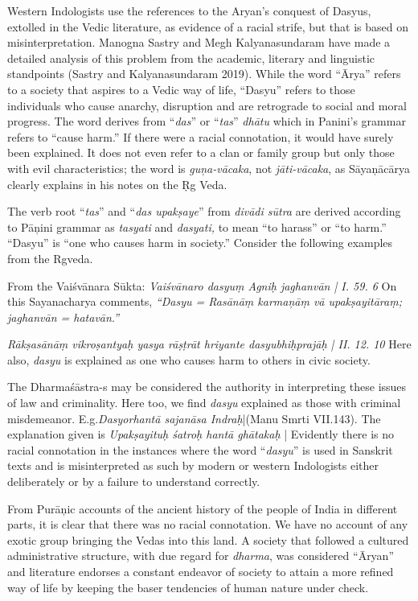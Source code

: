 Western Indologists use the references to the Aryan’s conquest of Dasyus, extolled in the Vedic literature, as evidence of a racial strife, but that is based on misinterpretation. Manogna Sastry and Megh Kalyanasundaram have made a detailed analysis of this problem from the academic, literary and linguistic standpoints (Sastry and Kalyanasundaram 2019). While the word “Ārya” refers to a society that aspires to a Vedic way of life, “Dasyu” refers to those individuals who cause anarchy, disruption and are retrograde to social and moral progress. The word derives from “\textit{das}” or “\textit{tas}” \textit{dhātu} which in Panini’s grammar refers to “cause harm.” If there were a racial connotation, it would have surely been explained. It does not even refer to a clan or family group but only those with evil characteristics; the word is \textit{guņa-vācaka}, not \textit{jāti-vācaka}, as Sāyaņācārya clearly explains in his notes on the Ṛg Veda.

The verb root “\textit{tas}” and “\textit{das upakṣaye}” from \textit{divādi sūtra} are derived according to Pāņini grammar as \textit{tasyati} and \textit{dasyati,} to mean “to harass” or “to harm.” “Dasyu” is “one who causes harm in society.” Consider the following examples from the Rgveda.

From the Vaiśvānara Sūkta: \textit{Vaiśvānaro dasyuṃ Agniḥ jaghanvān | I. 59. 6} On this Sayanacharya comments, \textit{“Dasyu = Rasānāṃ karmaņāṃ vā upakṣayitāraṃ; jaghanvān = hatavān.”}

\textit{Rākṣasānāṃ vikroṣantyaḥ yasya rāṣṭrāt hriyante dasyubhiḥprajāḥ | II. 12. 10} Here also, \textit{dasyu} is explained as one who causes harm to others in civic society.

The Dharmaśāstra-s may be considered the authority in interpreting these issues of law and criminality. Here too, we find \textit{dasyu} explained as those with criminal misdemeanor. E.g.\textit{Dasyorhantā sajanāsa Indraḥ}|(Manu Smrti VII.143). The explanation given is \textit{Upakṣayituḥ śatroḥ hantā ghātakaḥ} | Evidently there is no racial connotation in the instances where the word “\textit{dasyu}” is used in Sanskrit texts and is misinterpreted as such by modern or western Indologists either deliberately or by a failure to understand correctly.

From Purāņic accounts of the ancient history of the people of India in different parts, it is clear that there was no racial connotation. We have no account of any exotic group bringing the Vedas into this land. A society that followed a cultured administrative structure, with due regard for \textit{dharma}, was considered “Āryan” and literature endorses a constant endeavor of society to attain a more refined way of life by keeping the baser tendencies of human nature under check.

